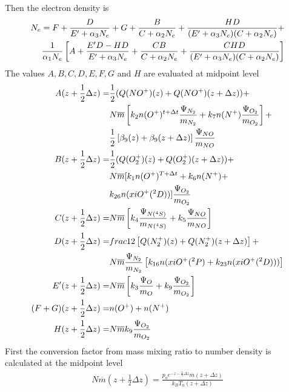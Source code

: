 %
Then the electron density is
%
\begin{align}
  N_e = F + \frac{D}{E' + \alpha_3 N_e} + G + \frac{B}{C+ \alpha_2
  N_e} + \frac{HD}{(E' + \alpha_3 N_e)(C+ \alpha_2 N_e)}+ \notag \\ \frac{1}{\alpha_1 N_e}
  \left[ A + \frac{E' D - HD}{E' + \alpha_3 N_e}+
  \frac{CB}{C+ \alpha_2 N_e}+ \frac{CHD}{(E' + \alpha_3 N_e)(C+\alpha_2 N_e)}\right]
\end{align}
%
The values $A, B, C, D, E, F, G$ and $H$ are evaluated at midpoint
level
%
\begin{align}
  A(z+\frac{1}{2} \Delta z) = & \frac{1}{2}( Q(NO^+)(z)+Q(NO^+)(z+ \Delta z))
  + \notag \\
       {} & N\overline{m} \left[ k_2 n(O^+)^{t+\Delta t}\frac{\Psi_{N_2}}{m_{N_2}} +
       k_7 n(N^+)\frac{\Psi_{O_2}}{m_{O_2}}\right] + \notag \\
       {} & \frac{1}{2}\left[\beta_9(z) + \beta_9(z+\Delta z)\right]
       \frac{\Psi_{NO}}{m_{NO}}\\
  B(z+\frac{1}{2} \Delta z) = & \frac{1}{2}(Q(O_2^+)(z)+Q(O_2^+)(z+ \Delta z)
  )+ \notag \\
   {} & N \overline{m} [ k_1 n(O^+)^{T+\Delta t} + k_6 n(N^+)+
   \notag \\
    {} & k_{26}n(xiO^+(^2D)) ]\frac{\Psi_{O_2}}{m_{O_2}} \\
  C(z+\frac{1}{2} \Delta z) = & N\overline{m} \left[ k_4 \frac{\Psi_{N(^4S)}}{m_{N(^4S)}} +
                               k_5 \frac{\Psi_{NO}}{m_{NO}}\right]
                               \\
  D(z+\frac{1}{2} \Delta z) = & frac{1}{2}\left[Q(N_2^+)(z) + Q(N_2^+)(z+ \Delta z)
  \right]+ \notag \\
          {} &          N\overline{m} \frac{\Psi_{N_2}}{m_{N_2}}\left[ k_{16}n(xiO^+(^2P) +
       k_{23}n(xiO^+(^2D)))\right] \\
  E'(z+\frac{1}{2} \Delta z) = & N\overline{m} \left[ k_3 \frac{\Psi_{O}}{m_{O}} +
                               k_9 \frac{\Psi_{O_2}}{m_{O_2}}\right]\\
  (F+G)(z+\frac{1}{2} \Delta z) = & n(O^+)+  n(N^+) \\
  H(z+\frac{1}{2} \Delta z)= & N\overline{m} k_9 \frac{\Psi_{O_2}}{m_{O_2}}
\end{align}
%
%
First the conversion factor from mass mixing ratio to number density
is calculated at the midpoint level
%
\begin{align}
  N \overline{m}(z+ \frac{1}{2}\Delta z) =
        \frac{p_o e^{-z - \frac{1}{2} \Delta z}\overline{m}(z + \Delta z)}
                    {k_B T_n(z + \Delta z)}
\end{align}
